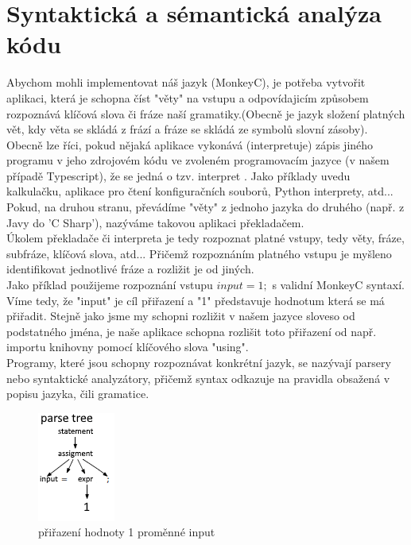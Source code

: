 \chapter{Syntaktická a sémantická analýza kódu}
Abychom mohli implementovat náš jazyk (MonkeyC), je potřeba vytvořit aplikaci, která je schopna číst "věty" na vstupu a odpovídajicím způsobem rozpoznává klíčová slova či fráze naší gramatiky.(Obecně je jazyk složení platných vět, kdy věta se skládá z frází a fráze se skládá ze symbolů slovní zásoby).\\
Obecně lze říci, pokud nějaká aplikace vykonává (interpretuje) zápis jiného programu v jeho zdrojovém kódu ve zvoleném programovacím jazyce (v našem případě Typescript), že se jedná o tzv. interpret \cite{Interpret_2020}. Jako příklady uvedu kalkulačku, aplikace pro čtení konfiguračních souborů, Python interprety, atd... Pokud, na druhou stranu, převádíme "věty" z jednoho jazyka do druhého (např. z Javy do 'C Sharp'), nazýváme takovou aplikaci překladačem.\\
Úkolem překladače či interpreta je tedy rozpoznat platné vstupy, tedy věty, fráze, subfráze, klíčová slova, atd... Přičemž rozpoznáním platného vstupu je myšleno identifikovat jednotlivé fráze a rozližit je od jiných.\\
Jako příklad použijeme rozpoznání vstupu $input = 1;$ s validní MonkeyC syntaxí.  Víme tedy, že "input" je cíl přiřazení a "1" představuje hodnotum která se má přiřadit. Stejně jako jsme my schopni rozližit v našem jazyce sloveso od podstatného jména, je naše aplikace schopna rozlišit toto přiřazení od např. importu knihovny pomocí klíčového slova "using".\\
Programy, které jsou schopny rozpoznávat konkrétní jazyk, se nazývají parsery nebo syntaktické analyzátory, přičemž syntax odkazuje na pravidla obsažená v popisu jazyka, čili gramatice.\\

\begin{figure}
	\centering
	\includegraphics[scale=1.5]{images/assigment}
	 \caption{přiřazení hodnoty 1 proměnné input}
	 \label{img:assigment}
\end{figure}


